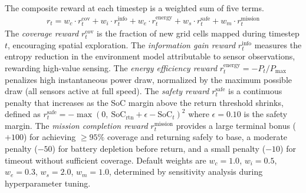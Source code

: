 \documentclass[conference]{IEEEtran}
\begin{document}
The composite reward at each timestep is a weighted sum of five terms.
\begin{align}
r_t = w_c \cdot r_t^{\text{cov}} + w_i \cdot r_t^{\text{info}} + w_e \cdot r_t^{\text{energy}} + w_s \cdot r_t^{\text{safe}} + w_m \cdot r_t^{\text{mission}}
\end{align}
The \textit{coverage reward} $r_t^{\text{cov}}$ is the fraction of new grid cells mapped during timestep $t$, encouraging spatial exploration. The \textit{information gain reward} $r_t^{\text{info}}$ measures the entropy reduction in the environment model attributable to sensor observations, rewarding high-value sensing. The \textit{energy efficiency reward} $r_t^{\text{energy}} = -P_t / P_{\max}$ penalizes high instantaneous power draw, normalized by the maximum possible draw (all sensors active at full speed). The \textit{safety reward} $r_t^{\text{safe}}$ is a continuous penalty that increases as the SoC margin above the return threshold shrinks, defined as $r_t^{\text{safe}} = -\max(0,\ \text{SoC}_{\text{rtn}} + \epsilon - \text{SoC}_t)^2$ where $\epsilon = 0.10$ is the safety margin. The \textit{mission completion reward} $r_t^{\text{mission}}$ provides a large terminal bonus ($+100$) for achieving $\geq 95\%$ coverage and returning safely to base, a moderate penalty ($-50$) for battery depletion before return, and a small penalty ($-10$) for timeout without sufficient coverage. Default weights are $w_c = 1.0$, $w_i = 0.5$, $w_e = 0.3$, $w_s = 2.0$, $w_m = 1.0$, determined by sensitivity analysis during hyperparameter tuning.
\end{document}
